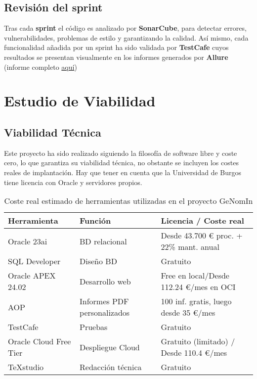 
\subsection{Revisión del sprint}
Tras cada \textbf{sprint} el código es analizado por \textbf{SonarCube}, para detectar errores, vulnerabilidades, problemas de estilo y garantizando la calidad. Así mismo, cada funcionalidad añadida por un sprint ha sido validada por \textbf{TestCafe} cuyos resultados se presentan visualmente en los informes generados por \textbf{Allure} (informe completo \href{https://far0010.github.io/TFGUBU-Fran_Arroyo/informe/#} {aquí})


\clearpage
\section{Estudio de Viabilidad}

\subsection{Viabilidad Técnica}
Este proyecto ha sido realizado siguiendo la filosofía de software libre y coste cero, lo que garantiza su viabilidad técnica, no obstante se incluyen los costes reales de implantación. Hay que tener en cuenta que la Universidad de Burgos tiene licencia con Oracle y servidores propios.

\begin{table}[ht]
	\centering
	\begin{tabular}{|p{3cm}|p{4cm}|p{4cm}|}
		\hline
		\rowcolor{gray!20}
		\textbf{Herramienta} & \textbf{Función} & \textbf{Licencia / Coste real} \\
		\hline
		Oracle 23ai & BD relacional & Desde 43.700 € proc. + 22\% mant. anual \\
		\hline
		SQL Developer & Diseño BD & Gratuito \\
		\hline
		Oracle APEX 24.02 & Desarrollo web & Free en local/Desde 112.24 €/mes en OCI \\
		\hline
		\acrshort{AOP} & Informes PDF personalizados & 100 inf. gratis, luego desde 35 €/mes \\
		\hline
		TestCafe & Pruebas & Gratuito \\
		\hline
		Oracle Cloud Free Tier & Despliegue Cloud & Gratuito (limitado) / Desde 110.4 €/mes \\
		\hline
		TeXstudio & Redacción técnica & Gratuito \\
		\hline
	\end{tabular}
	\caption{Coste real estimado de herramientas utilizadas en el proyecto GeNomIn}
\end{table}
